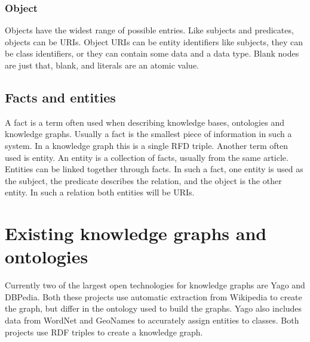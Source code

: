 \subsubsection{Object}
Objects have the widest range of possible entries. Like subjects and predicates, objects can be URIs. Object URIs can be entity identifiers like subjects, they can be class identifiers, or they can contain some data and a data type. Blank nodes are just that, blank, and literals are an atomic value. 

\subsection{Facts and entities}
A fact is a term often used when describing knowledge bases, ontologies and knowledge graphs. Usually a fact is the smallest piece of information in such a system. In a knowledge graph this is a single RFD triple. Another term often used is entity. An entity is a collection of facts, usually from the same article. Entities can be linked together through facts. In such a fact, one entity is used as the subject, the predicate describes the relation, and the object is the other entity. In such a relation both entities will be URIs.








\section{Existing knowledge graphs and ontologies}
Currently two of the largest open technologies for knowledge graphs are Yago and DBPedia. Both these projects use automatic extraction from Wikipedia to create the graph, but differ in the ontology used to build the graphs. Yago also includes data from WordNet and GeoNames to accurately assign entities to classes. Both projects use RDF triples to create a knowledge graph.\\

